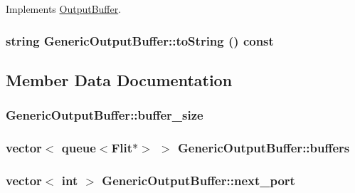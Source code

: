 Implements \hyperlink{classOutputBuffer_5fafb6827567941d238ae16991c5c1a8}{OutputBuffer}.\hypertarget{classGenericOutputBuffer_746612d97dbd6240764632638931d3fa}{
\subsubsection[{toString}]{\setlength{\rightskip}{0pt plus 5cm}string GenericOutputBuffer::toString () const}}
\label{classGenericOutputBuffer_746612d97dbd6240764632638931d3fa}




\subsection{Member Data Documentation}
\hypertarget{classGenericOutputBuffer_98d12e7f17f1ce56b89db973b9efe7b0}{
\subsubsection[{buffer\_\-size}]{ {\bf GenericOutputBuffer::buffer\_\-size}}}
\label{classGenericOutputBuffer_98d12e7f17f1ce56b89db973b9efe7b0}


\hypertarget{classGenericOutputBuffer_561cd725dc95f8c57fda666df9980313}{
\subsubsection[{buffers}]{\setlength{\rightskip}{0pt plus 5cm}vector$<$ queue$<${\bf Flit}$\ast$$>$ $>$ {\bf GenericOutputBuffer::buffers}}}
\label{classGenericOutputBuffer_561cd725dc95f8c57fda666df9980313}


\hypertarget{classGenericOutputBuffer_fadacb202322788766670e54b1d8430c}{
\subsubsection[{next\_\-port}]{\setlength{\rightskip}{0pt plus 5cm}vector$<$ int $>$ {\bf GenericOutputBuffer::next\_\-port}}}
\label{classGenericOutputBuffer_fadacb202322788766670e54b1d8430c}


